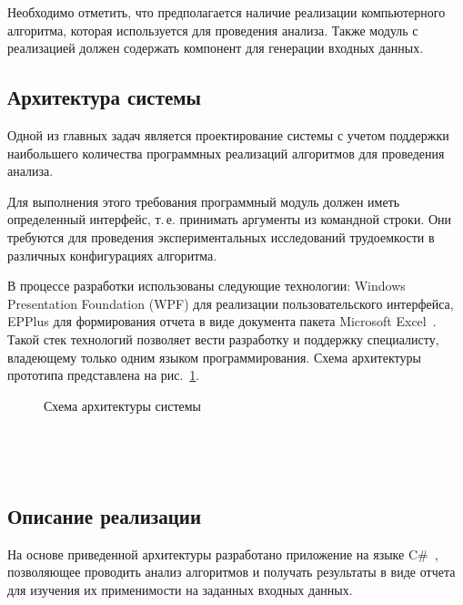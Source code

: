 \documentclass[a4paper, article, 14pt]{extarticle}
\begin{document}
Необходимо отметить, что предполагается наличие реализации компьютерного алгоритма, которая используется для проведения анализа. Также модуль с реализацией должен содержать компонент для генерации входных данных.

\subsection{Архитектура системы}\label{sec:arhitecture}

Одной из главных задач является проектирование системы с учетом поддержки наибольшего количества программных реализаций алгоритмов для проведения анализа.

Для выполнения этого требования программный модуль должен иметь определенный интерфейс, т.\,е. принимать аргументы из командной строки. Они требуются для проведения экспериментальных исследований трудоемкости в различных конфигурациях алгоритма.

В процессе разработки использованы следующие технологии: Windows Presentation Foundation (WPF) для реализации пользовательского интерфейса, EPPlus для формирования отчета в виде документа пакета Microsoft Excel~\cite{excel}. Такой стек технологий позволяет вести разработку и поддержку специалисту, владеющему только одним языком программирования. Схема архитектуры прототипа представлена на рис.~\ref{fig:arhitecture}.

\begin{figure}[h]
	\caption{Схема архитектуры системы}
	\label{fig:arhitecture}
\end{figure}

\

\

\subsection{Описание реализации}\label{sec:implementation}

На основе приведенной архитектуры разработано приложение на языке C\#~\cite{system_source}, позволяющее проводить анализ алгоритмов и получать результаты в виде отчета для изучения их применимости на заданных входных данных.
\end{document}
